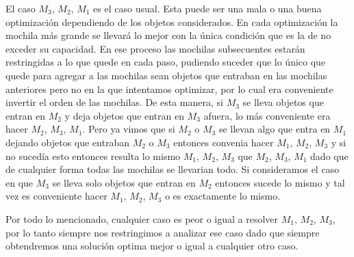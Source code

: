 El caso $M_3$, $M_2$, $M_1$ es el caso usual. Esta puede ser una mala o una buena optimización dependiendo de los objetos considerados. En cada optimización la mochila más grande se llevará lo mejor con la única condición que es la de no exceder su capacidad. En ese proceso las mochilas subsecuentes estarán restringidas a lo que quede en cada paso, pudiendo suceder que lo único que quede para agregar a las mochilas sean objetos que entraban en las mochilas anteriores pero no en la que intentamos optimizar, por lo cual era conveniente invertir el orden de las mochilas. 
De esta manera, si $M_3$ se lleva objetos que entran en $M_2$ y deja objetos que entran en $M_3$ afuera, lo más conveniente era hacer $M_2$, $M_3$, $M_1$. Pero ya vimos que si $M_2$ o $M_3$ se llevan algo que entra en $M_1$ dejando objetos que entraban $M_2$ o $M_3$ entonces convenia hacer $M_1$, $M_2$, $M_3$ y si no sucedía esto entonces resulta lo mismo $M_1$, $M_2$, $M_3$ que $M_2$, $M_3$, $M_1$ dado que de cualquier forma todas las mochilas se llevarian todo.
Si consideramos el caso en que $M_3$ se lleva solo objetos que entran en $M_2$ entonces sucede lo mismo y tal vez es conveniente hacer $M_1$, $M_2$, $M_3$ o es exactamente lo mismo. 

Por todo lo mencionado, cualquier caso es peor o igual a resolver $M_1$, $M_2$, $M_3$, por lo tanto siempre nos restringimos a analizar ese caso dado que siempre obtendremos una solución optima mejor o igual a cualquier otro caso.
